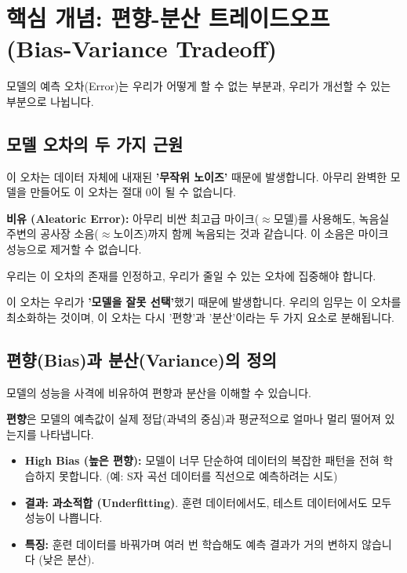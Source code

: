 \documentclass[11pt,a4paper]{book}
\theoremstyle{definition}
\begin{document}
\section{핵심 개념: 편향-분산 트레이드오프 (Bias-Variance Tradeoff)}

모델의 예측 오차(Error)는 우리가 어떻게 할 수 없는 부분과, 우리가 개선할 수 있는 부분으로 나뉩니다.

\subsection{모델 오차의 두 가지 근원}

\begin{tcolorbox}[title={1. 환원 불가능한 오차 (Irreducible Error)}]
이 오차는 데이터 자체에 내재된 \textbf{'무작위 노이즈'} 때문에 발생합니다.
아무리 완벽한 모델을 만들어도 이 오차는 절대 0이 될 수 없습니다.

\begin{examplebox}
\textbf{비유 (Aleatoric Error):}
아무리 비싼 최고급 마이크($\approx$모델)를 사용해도, 녹음실 주변의 공사장 소음($\approx$노이즈)까지 함께 녹음되는 것과 같습니다. 이 소음은 마이크 성능으로 제거할 수 없습니다.

우리는 이 오차의 존재를 인정하고, 우리가 줄일 수 있는 오차에 집중해야 합니다.
\end{examplebox}
\end{tcolorbox}

\begin{tcolorbox}[title={2. 환원 가능한 오차 (Reducible Error)}]
이 오차는 우리가 \textbf{'모델을 잘못 선택'}했기 때문에 발생합니다.
우리의 임무는 이 오차를 최소화하는 것이며, 이 오차는 다시 '편향'과 '분산'이라는 두 가지 요소로 분해됩니다.
\end{tcolorbox}

\subsection{편향(Bias)과 분산(Variance)의 정의}

모델의 성능을 사격에 비유하여 편향과 분산을 이해할 수 있습니다.

\begin{tcolorbox}[title={편향 (Bias): 과녁을 놓치다 (부정확성)}]
\textbf{편향}은 모델의 예측값이 실제 정답(과녁의 중심)과 평균적으로 얼마나 멀리 떨어져 있는지를 나타냅니다.

\begin{itemize}
    \item \textbf{High Bias (높은 편향):} 모델이 너무 단순하여 데이터의 복잡한 패턴을 전혀 학습하지 못합니다. (예: S자 곡선 데이터를 직선으로 예측하려는 시도)
    \item \textbf{결과:} \textbf{과소적합 (Underfitting)}. 훈련 데이터에서도, 테스트 데이터에서도 모두 성능이 나쁩니다.
    \item \textbf{특징:} 훈련 데이터를 바꿔가며 여러 번 학습해도 예측 결과가 거의 변하지 않습니다 (낮은 분산).
\end{itemize}
\end{tcolorbox}
\end{document}
